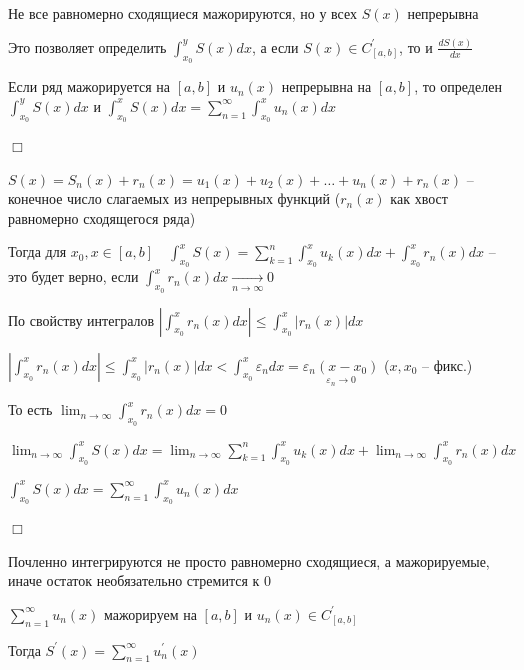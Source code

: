 \documentclass[12pt]{article}
\begin{document}
    \Nota Не все равномерно сходящиеся мажорируются, но у всех $S(x)$ непрерывна

    Это позволяет определить $\int_{x_0}^y S(x) dx$, а если $S(x) \in C^\prime_{[a, b]}$, то и $\frac{dS(x)}{dx}$

    \hypertarget{functionalsumintegral}{}

    \begin{MyTheorem}
        \Ths Если ряд мажорируется на $[a, b]$ и $u_n(x)$ непрерывна на $[a, b]$, то определен $\int_{x_0}^y S(x)dx$ и 
        $\int_{x_0}^x S(x)dx  = \sum_{n = 1}^\infty \int_{x_0}^x u_n(x) dx$
    \end{MyTheorem}

    \begin{MyProof}
        $\Box$

        $S(x) = S_n(x) + r_n(x) = u_1(x) + u_2(x) + \dots + u_n(x) + r_n(x)$ -- конечное число слагаемых из непрерывных функций
        ($r_n(x)$ как хвост равномерно сходящегося ряда)

        Тогда для $x_0, x \in [a, b] \quad \int_{x_0}^x S(x) = \sum_{k = 1}^n \int_{x_0}^x u_k(x) dx + \int_{x_0}^x r_n(x) dx$ -- это будет
        верно, если $\int_{x_0}^x r_n(x) dx \underset{n \to \infty}{\longrightarrow} 0$

        По свойству интегралов $\left|\int_{x_0}^x r_n(x) dx\right| \leq \int_{x_0}^x |r_n(x)| dx$

        $\left|\int_{x_0}^x r_n(x) dx\right| \leq \int_{x_0}^x |r_n(x)| dx < \int_{x_0}^x \varepsilon_n dx = \underset{\varepsilon_n \to 0}{\varepsilon_n (x - x_0)}$ ($x, x_0$ -- фикс.)

        То есть $\lim_{n \to \infty} \int_{x_0}^x r_n(x) dx = 0$

        $\lim_{n \to \infty} \int_{x_0}^x S(x) dx = \lim_{n \to \infty} \sum_{k = 1}^n \int_{x_0}^x u_k(x) dx + \lim_{n \to \infty} \int_{x_0}^x r_n(x) dx$

        $\int_{x_0}^x S(x) dx = \sum_{n = 1}^\infty \int_{x_0}^x u_n(x) dx$

        $\Box$
    \end{MyProof}

    \Nota Почленно интегрируются не просто равномерно сходящиеся, а мажорируемые, иначе остаток необязательно стремится к 0

    \hypertarget{functionalsumderivative}{}

    \begin{MyTheorem}
        \Ths $\sum_{n = 1}^\infty u_n(x)$ мажорируем на $[a, b]$ и $u_n(x) \in C^\prime_{[a, b]}$

        Тогда $S^\prime(x) = \sum_{n = 1}^\infty u^\prime_n(x)$
    \end{MyTheorem}
\end{document}
